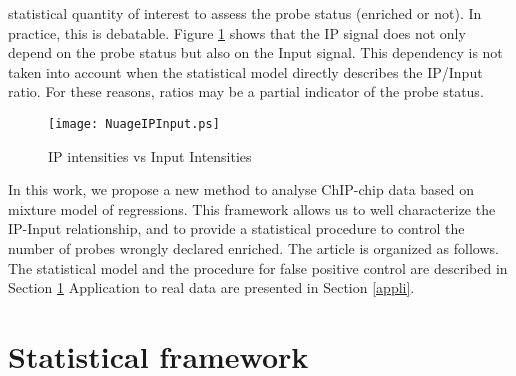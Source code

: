 \documentclass{llncs}
\begin{document}
statistical quantity of interest to assess the probe status (enriched
or not).  In practice, this is debatable.
Figure
\ref{Figure:NuageIPInput} shows that the IP signal does not only depend on
the probe status but also on the Input signal.  This dependency is not
taken into account when the statistical model directly describes the
IP/Input ratio. For these reasons, ratios may be a partial indicator
of the probe status. {\par}
\begin{figure}
\begin{center}
\texttt{[image: NuageIPInput.ps]}
\end{center}
\caption{IP intensities vs Input Intensities
\label{Figure:NuageIPInput}}
\end{figure}

In this work, we propose a new method to analyse ChIP-chip data based
on mixture model of regressions.  This framework allows us to well
characterize the IP-Input relationship, and to provide a statistical
procedure to control the number of probes wrongly declared enriched.
The article is organized as follows. The statistical model and the
procedure for false positive control are described in Section
\ref{methodo} Application to real data are presented in Section
\ref{appli}.

\section{Statistical framework}\label{methodo}
\end{document}
